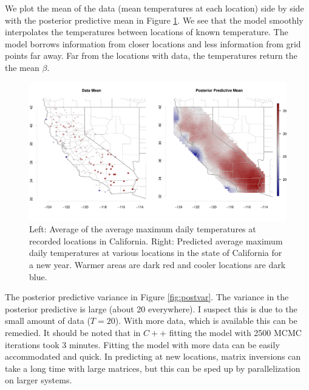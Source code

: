 \documentclass[11pt]{article}
\def\beginmyfig{\begin{figure}[h]\center}
\def\endmyfig{\end{figure}}
\begin{document}
\noindent
We plot the mean of the data (mean temperatures at each location) side by side
with the posterior predictive mean in Figure \ref{fig:postmean}. We see that
the model smoothly interpolates the temperatures between locations of known
temperature. The model borrows information from closer locations and less
information from grid points far away. Far from the locations with data, the
temperatures return the the mean $\beta$.

\beginmyfig
  \includegraphics[scale=.5]{../graphs/postpredmean.pdf}
  \caption{Left: Average of the average maximum daily temperatures at recorded locations
  in California.
  Right: Predicted average maximum daily temperatures at various locations in
  the state of California for a new year.  Warmer areas are dark red and cooler
  locations are dark blue.}
  \label{fig:postmean}
\endmyfig

\noindent
The posterior predictive variance in Figure \ref{fig:postvar}.  The variance in
the posterior predictive is large (about 20 everywhere). I suspect this is due
to the small amount of data ($T=20$). With more data, which is available this
can be remedied. It should be noted that in $C++$ fitting the model with 2500
MCMC iterations took 3 minutes.  Fitting the model with more data can be easily
accommodated and quick. In predicting at new locations, matrix inversions can
take a long time with large matrices, but this can be sped up by
parallelization on larger systems.
\end{document}
